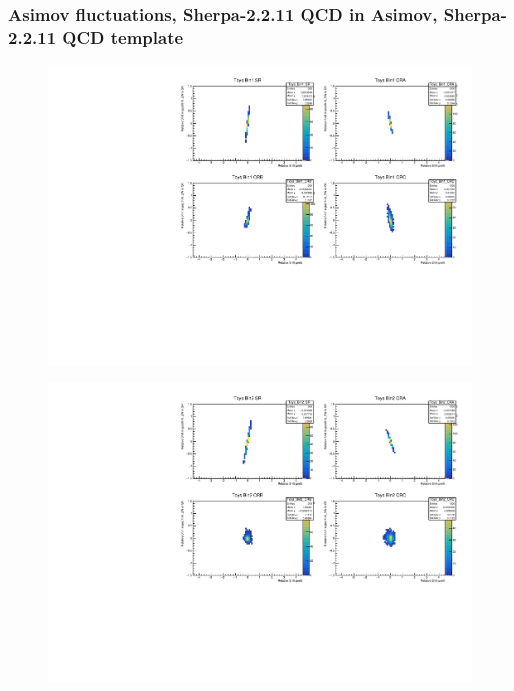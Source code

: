 \subsubsection{\mjj Asimov fluctuations, Sherpa-2.2.11 QCD in Asimov, Sherpa-2.2.11 QCD template}
\begin{figure}[H]
\includegraphics[width=\textwidth]{plots/diffx/instab/constfx/instabilities_mjj_QCD_Sh2211_Signal_Sh2211_BSDATASTATS_sherpaasimov_bin1.pdf}
\end{figure}
\begin{figure}[H]
\includegraphics[width=\textwidth]{plots/diffx/instab/constfx/instabilities_mjj_QCD_Sh2211_Signal_Sh2211_BSDATASTATS_sherpaasimov_bin2.pdf}
\end{figure}
